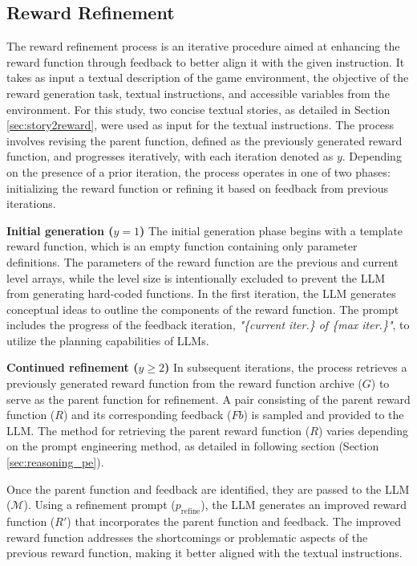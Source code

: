 \subsection{Reward Refinement}
\label{sec:reward_refinement}
The reward refinement process is an iterative procedure aimed at enhancing the reward function through feedback to better align it with the given instruction.
It takes as input a textual description of the game environment, the objective of the reward generation task, textual instructions, and accessible variables from the environment. For this study, two concise textual stories, as detailed in Section \ref{sec:story2reward}, were used as input for the textual instructions.
The process involves revising the parent function, defined as the previously generated reward function, and progresses iteratively, with each iteration denoted as \( y \). Depending on the presence of a prior iteration, the process operates in one of two phases: initializing the reward function or refining it based on feedback from previous iterations.


\textbf{Initial generation (\( y = 1 \))}
The initial generation phase begins with a template reward function, which is an empty function containing only parameter definitions. The parameters of the reward function are the previous and current level arrays, while the level size is intentionally excluded to prevent the LLM from generating hard-coded functions.
In the first iteration, the LLM generates conceptual ideas to outline the components of the reward function.
The prompt includes the progress of the feedback iteration, \textit{"\{current iter.\} of \{max iter.\}"}, to utilize the planning capabilities of LLMs.

\textbf{Continued refinement (\( y \geq 2 \))}
In subsequent iterations, the process retrieves a previously generated reward function from the reward function archive ($G$) to serve as the parent function for refinement. A pair consisting of the parent reward function (\( R \)) and its corresponding feedback ($Fb$) is sampled and provided to the LLM. The method for retrieving the parent reward function ($R$) varies depending on the prompt engineering method, as detailed in following section (Section \ref{sec:reasoning_pe}).

Once the parent function and feedback are identified, they are passed to the LLM ($\mathcal{M}$). Using a refinement prompt (\( p_\text{refine} \)), the LLM generates an improved reward function ($R'$) that incorporates the parent function and feedback.
The improved reward function addresses the shortcomings or problematic aspects of the previous reward function, making it better aligned with the textual instructions.


